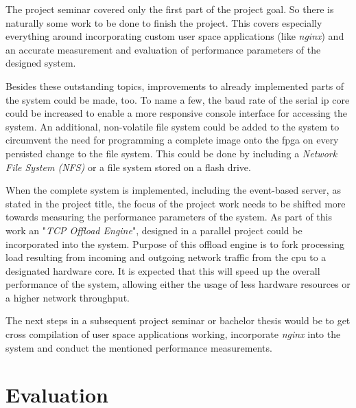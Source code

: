 The project seminar covered only the first part of the project goal. So there is naturally some work to be done to finish the project. This covers especially everything around incorporating custom user space applications (like \textit{nginx}) and an accurate measurement and evaluation of performance parameters of the designed system.

Besides these outstanding topics, improvements to already implemented parts of the system could be made, too. To name a few, the baud rate of the serial \gls{ip} core could be increased to enable a more responsive console interface for accessing the system. An additional, non-volatile file system could be added to the system to circumvent the need for programming a complete image onto the \gls{fpga} on every persisted change to the file system. This could be done by including a \textit{Network File System (NFS)} or a file system stored on a flash drive.

When the complete system is implemented, including the event-based server, as stated in the project title, the focus of the project work needs to be shifted more towards measuring the performance parameters of the system. As part of this work an "\textit{TCP Offload Engine}", designed in a parallel project could be incorporated into the system. Purpose of this offload engine is to fork processing load resulting from incoming and outgoing network traffic from the \gls{cpu} to a designated hardware core. It is expected that this will speed up the overall performance of the system, allowing either the usage of less hardware resources or a higher network throughput.

The next steps in a subsequent project seminar or bachelor thesis would be to get  cross compilation of user space applications working, incorporate \textit{nginx} into the system and conduct the mentioned performance measurements.


\section{Evaluation}
